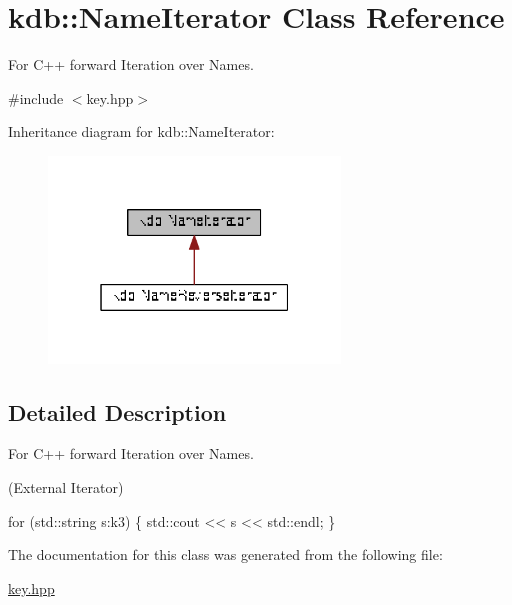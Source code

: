 \hypertarget{classkdb_1_1NameIterator}{}\section{kdb\+:\+:Name\+Iterator Class Reference}
\label{classkdb_1_1NameIterator}


For C++ forward Iteration over Names.  




{\ttfamily \#include $<$key.\+hpp$>$}



Inheritance diagram for kdb\+:\+:Name\+Iterator\+:
\nopagebreak
\begin{figure}[H]
\begin{center}
\leavevmode
\includegraphics[width=220pt]{classkdb_1_1NameIterator__inherit__graph}
\end{center}
\end{figure}


\subsection{Detailed Description}
For C++ forward Iteration over Names. 

(External Iterator) 
\begin{DoxyCode}
\textcolor{keywordflow}{for} (std::string s:k3)
\{
   std::cout << s << std::endl;
\}
\end{DoxyCode}
 

The documentation for this class was generated from the following file\+:\begin{DoxyCompactItemize}
\item 
\hyperlink{key_8hpp}{key.\+hpp}\end{DoxyCompactItemize}
